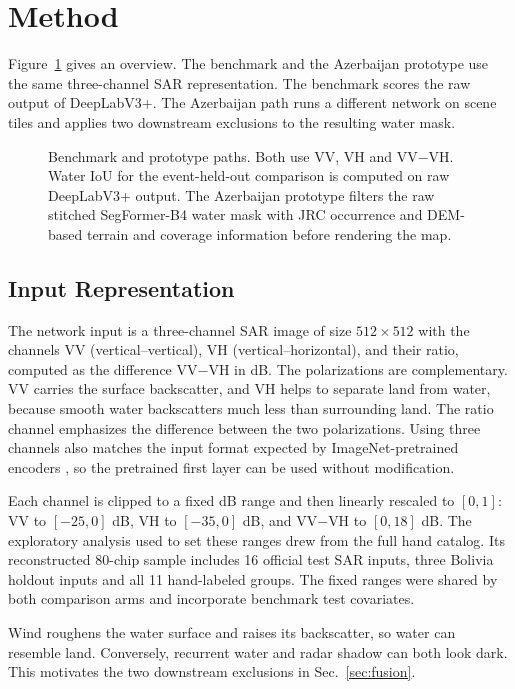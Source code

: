 \section{Method}
\label{sec:method}

Figure~\ref{fig:pipeline} gives an overview. The benchmark and the
Azerbaijan prototype use the same three-channel SAR representation.
The benchmark scores the raw output of DeepLabV3+. The Azerbaijan path
runs a different network on scene tiles and applies two downstream
exclusions to the resulting water mask.

\begin{figure}[!htbp]
\centering

\caption{Benchmark and prototype paths. Both use VV, VH and VV$-$VH.
Water IoU for the event-held-out comparison is computed on raw
DeepLabV3+ output. The Azerbaijan prototype filters the raw stitched
SegFormer-B4 water mask with JRC occurrence and DEM-based terrain and
coverage information before rendering the map.}
\label{fig:pipeline}
\end{figure}

\subsection{Input Representation}
\label{sec:input}

The network input is a three-channel SAR image of size $512\times512$
with the channels VV (vertical--vertical), VH (vertical--horizontal),
and their ratio, computed as the difference VV$-$VH in dB. The
polarizations are complementary. VV carries the surface backscatter,
and VH helps to separate land from water, because smooth water
backscatters much less than surrounding land. The ratio channel emphasizes
the difference between the two polarizations. Using three channels also
matches the input format expected by ImageNet-pretrained encoders
\cite{deng2009}, so the pretrained first layer can be used without
modification.

Each channel is clipped to a fixed dB range and then linearly rescaled to
$[0,1]$: VV to $[-25,0]$ dB, VH to $[-35,0]$ dB, and VV$-$VH to
$[0,18]$ dB. The exploratory analysis used to set these ranges drew from
the full hand catalog. Its reconstructed 80-chip sample includes 16
official test SAR inputs, three Bolivia holdout inputs and all 11
hand-labeled groups. The fixed ranges were shared by both comparison
arms and incorporate benchmark test covariates.

Wind roughens the water surface and raises its backscatter, so water can
resemble land. Conversely, recurrent water and radar shadow can both
look dark. This motivates the two downstream exclusions in
Sec.~\ref{sec:fusion}.

